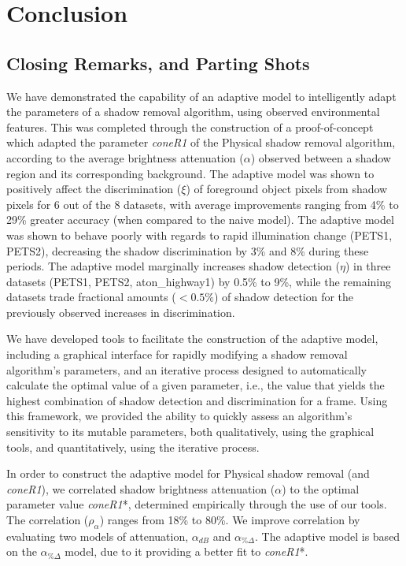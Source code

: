 \clearpage
\chapter{Conclusion}

\section{Closing Remarks, and Parting Shots}

We have demonstrated the capability of an adaptive model to intelligently adapt the parameters of a shadow removal algorithm, using observed environmental features. This was completed through the construction of a proof-of-concept which adapted the parameter \textit{coneR1} of the Physical shadow removal algorithm, according to the average brightness attenuation ($\alpha$) observed between a shadow region and its corresponding background. The adaptive model was shown to positively affect the discrimination ($\xi$) of foreground object pixels from shadow pixels for 6 out of the 8 datasets, with average improvements ranging from 4\% to 29\% greater accuracy (when compared to the naive model). The adaptive model was shown to behave poorly with regards to rapid illumination change (PETS1, PETS2), decreasing the shadow discrimination by 3\% and 8\% during these periods. The adaptive model marginally increases shadow detection ($\eta$) in three datasets (PETS1, PETS2, aton\_highway1) by 0.5\% to 9\%, while the remaining datasets trade fractional amounts ($< 0.5\%$) of shadow detection for the previously observed increases in discrimination.

We have developed tools to facilitate the construction of the adaptive model, including a graphical interface for rapidly modifying a shadow removal algorithm's parameters, and an iterative process designed to automatically calculate the optimal value of a given parameter, i.e., the value that yields the highest combination of shadow detection and discrimination for a frame. Using this framework, we provided the ability to quickly assess an algorithm's sensitivity to its mutable parameters, both qualitatively, using the graphical tools, and quantitatively, using the iterative process.

In order to construct the adaptive model for Physical shadow removal (and \textit{coneR1}), we correlated shadow brightness attenuation ($\alpha$) to the optimal parameter value \textit{coneR1}*, determined empirically through the use of our tools. The correlation ($\rho_{\alpha}$) ranges from 18\% to 80\%. We improve correlation by evaluating two models of attenuation, $\alpha_{dB}$ and $\alpha_{\%\Delta}$. The adaptive model is based on the $\alpha_{\%\Delta}$ model, due to it providing a better fit to \textit{coneR1}*. 

